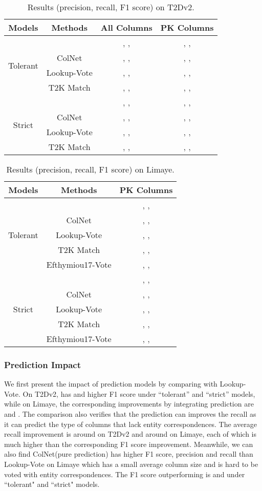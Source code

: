 \documentclass[letterpaper]{article}
\newcommand{\rv}[1]{{\color{black}#1}}
\newcommand{\ColNet}{\textsf{ColNet}\xspace}
\begin{document}
\begin{table}[h!]
\scriptsize{
\centering
\begin{tabular}[t]{c|c|c|c}
\hline
Models & Methods& All Columns & PK Columns    \\\hline 
\multirow{4}{*}{Tolerant}& & , ,  & , ,  \\
&\ColNet &, ,  & , ,  \\
&Lookup-Vote &, ,  & , ,  \\
&T2K Match & , ,  & , ,  \\\hline\hline
\multirow{4}{*}{Strict} & & , ,  & , ,  \\
&\ColNet & , ,   & , ,   \\
&Lookup-Vote & , ,  & , ,  \\
&T2K Match & , ,  & , ,  \\\hline
\end{tabular}
\caption{
\label{res:t2d}
\rv{Results (precision, recall, F1 score) on T2Dv2.}
}
}
\end{table}

\begin{table}[h!]
\scriptsize{
\centering
\begin{tabular}[t]{c|c|c}
\hline
Models & Methods& PK Columns   \\\hline 
\multirow{5}{*}{Tolerant}& &, ,    \\
&\ColNet & , ,  \\
&Lookup-Vote & , ,   \\
&T2K Match & , , \\
&Efthymiou17-Vote & , ,   \\\hline\hline
\multirow{5}{*}{Strict}& &, ,    \\
&\ColNet & , ,   \\
&Lookup-Vote & , ,  \\
&T2K Match & , ,  \\
&Efthymiou17-Vote & , ,    \\\hline
\end{tabular}
\caption{
\label{res:limaye}
\rv{Results (precision, recall, F1 score) on Limaye.}
}
}
\end{table}


\subsubsection{Prediction Impact} 
\rv{
We first present the impact of prediction models by comparing  with Lookup-Vote.
On T2Dv2,  has  and  higher F1 score under ``tolerant'' and ``strict'' models,
while on Limaye, the corresponding improvements by integrating prediction are  and .
The comparison also verifies that the prediction can improves the recall as it can predict the type of columns that lack entity correspondences.
The average recall improvement is around  on T2Dv2 
and around  on Limaye,
each of which is much higher than the corresponding F1 score improvement.
}
\rv{
Meanwhile, we can also find \ColNet (pure prediction) has higher F1 score, precision and recall than Lookup-Vote on Limaye which has a small average column size and is hard to be voted with entity correspondences.
The F1 score outperforming is  and  under ``tolerant" and ``strict" models. 
}
\end{document}
